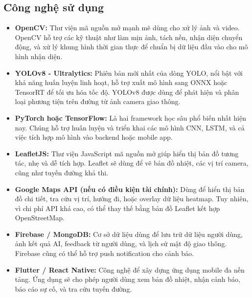 \subsection{Công nghệ sử dụng}
\begin{itemize}
  \item \textbf{OpenCV:} Thư viện mã nguồn mở mạnh mẽ dùng cho xử lý ảnh và video. OpenCV hỗ trợ các kỹ thuật như làm mịn ảnh, tách nền, nhận diện chuyển động, và xử lý khung hình thời gian thực để chuẩn bị dữ liệu đầu vào cho mô hình nhận diện.

  \item \textbf{YOLOv8 - Ultralytics:} Phiên bản mới nhất của dòng YOLO, nổi bật với khả năng huấn luyện linh hoạt, hỗ trợ xuất mô hình sang ONNX hoặc TensorRT để tối ưu hóa tốc độ. YOLOv8 được dùng để phát hiện và phân loại phương tiện trên đường từ ảnh camera giao thông.

  \item \textbf{PyTorch hoặc TensorFlow:} Là hai framework học sâu phổ biến nhất hiện nay. Chúng hỗ trợ huấn luyện và triển khai các mô hình CNN, LSTM, và cả việc tích hợp mô hình vào backend hoặc mobile app.

  \item \textbf{LeafletJS:} Thư viện JavaScript mã nguồn mở giúp hiển thị bản đồ tương tác, nhẹ và dễ tích hợp. Leaflet sẽ dùng để vẽ bản đồ nhiệt, các vị trí camera, cũng như tuyến đường khả thi.

  \item \textbf{Google Maps API (nếu có điều kiện tài chính):} Dùng để hiển thị bản đồ chi tiết, tra cứu vị trí, hướng đi, hoặc overlay dữ liệu heatmap. Tuy nhiên, vì chi phí API khá cao, có thể thay thế bằng bản đồ Leaflet kết hợp OpenStreetMap.

  \item \textbf{Firebase / MongoDB:} Cơ sở dữ liệu dùng để lưu trữ dữ liệu người dùng, ảnh kết quả AI, feedback từ người dùng, và lịch sử mật độ giao thông. Firebase cũng có thể hỗ trợ push notification cho cảnh báo.

  \item \textbf{Flutter / React Native:} Công nghệ để xây dựng ứng dụng mobile đa nền tảng. Ứng dụng sẽ cho phép người dùng xem bản đồ nhiệt, nhận cảnh báo, báo cáo sự cố, và tra cứu tuyến đường.
\end{itemize}
